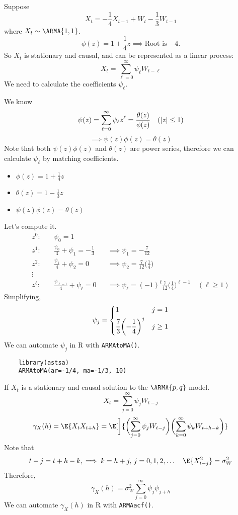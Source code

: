 \begin{Example}{}{}
    Suppose
    \[ X_t =-\frac{1}{4} X_{t-1}+W_t-\frac{1}{3}W_{t-1}\]
    where $X_t \sim \ARMA{1,1}$.
    \[\phi(z)=1+\frac{1}{4}z \implies \text{Root is $-4$.}\]
    So $X_t$ is stationary and causal, and can be represented as a linear process:
    \[X_t= \sum^{\infty}_{\ell=0} \psi_\ell W_{t-\ell} \]
    We need to calculate the coefficients $\psi_\ell$.

    We know
    \[\psi(z)= \sum^{\infty}_{\ell=0} \psi_\ell z^\ell = \frac{\theta(z)}{\phi(z)}\quad (\lvert z\rvert\leq 1)  \]
    \[\implies \psi(z)\phi(z)=\theta(z) \]
    Note that both $ \psi(z)\phi(z) $ and $ \theta(z) $ are power series, therefore
    we can calculate $ \psi_\ell $ by matching coefficients.
    \begin{itemize}
        \item $ \displaystyle \phi(z)=1+ \frac{1}{4}z $
        \item $ \displaystyle  \theta(z)= 1-\frac{1}{3}z $
        \item $ \psi(z)\phi(z)=\theta(z) $
    \end{itemize}
    Let's compute it.
    \begin{align*}
        z^0    :\quad & \psi_0=1                                                                                          \\
        z^1    :\quad & \frac{\psi_0}{4}+\psi_1=-\frac{1}{3}  &  & \implies \psi_1=-\frac{7}{12}                          \\
        z^2    :\quad & \frac{\psi_1}{4}+\psi_2 = 0           &  & \implies \psi_2=\frac{7}{12} \biggl(\frac{1}{4}\biggr) \\
        \vdots \quad  &                                                                                                   \\
        z^\ell :\quad & \frac{\psi_{\ell-1}}{4} + \psi_\ell=0 &  & \implies
        \psi_\ell= (-1)^{\ell}\frac{7}{12}\biggl(\frac{1}{4}\biggr)^{\ell-1}\quad(\ell\ge 1)
    \end{align*}
    Simplifying,
    \[ \psi_j=
        \begin{dcases}
            1                                        & j=1    \\
            \frac{7}{3} \biggl(-\frac{1}{4}\biggr)^j & j\ge 1
        \end{dcases} \]
    We can automate $ \psi_j $ in R with \texttt{ARMAtoMA()}.
    \begin{verbatim}
    library(astsa)
    ARMAtoMA(ar=-1/4, ma=-1/3, 10)
    \end{verbatim}
    If $X_t$ is a stationary and causal solution to the $\ARMA{p,q}$ model.
    \[X_t = \sum^{\infty}_{j=0} \psi_j W_{t-j}\]
    \[\gamma_X(h) =
        \E{X_t X_{t+h}}= \E[\bigg]{\biggl(\sum^{\infty}_{j=0}\psi_j W_{t-j}\biggr)\biggl(\sum^{\infty}_{k=0} \psi_k W_{t+h-k}\biggr)} \]
    Note that
    \[t-j= t+h-k, \implies k=h+j,\, j=0,1,2,\ldots\quad  \E{X^2_{t-j}}=\sigma_W^2\]
    Therefore,
    \[\gamma_X(h) =\sigma_W^2 \sum^{\infty}_{j=0} \psi_j \psi_{j+h} \]
    We can automate $\gamma_X(h)$ in R with \texttt{ARMAacf()}.


\end{Example}
